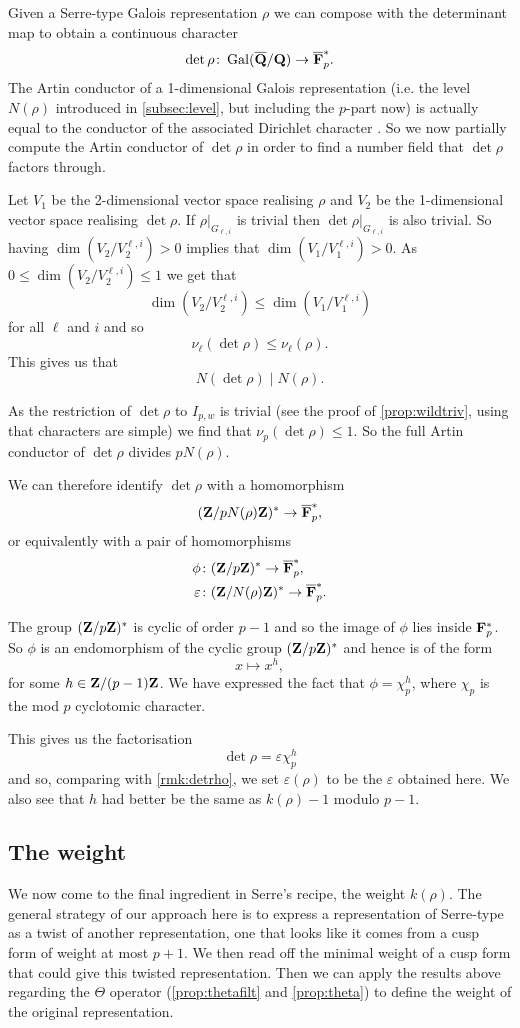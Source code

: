 \documentclass[a4paper,12pt]{article}
\begin{document}
Given a Serre-type Galois representation $\rho$ we can compose with the determinant map to obtain a continuous character
\[
\det \rho\colon \operatorname{Gal}(\overline{\mathbf{Q}}/\mathbf{Q}) \to \overline{\mathbf{F}}_p^*.
\]
The Artin conductor of a 1-dimensional Galois representation (i.e. the level $N(\rho)$ introduced in \cref{subsec:level}, but including the $p$-part now) is actually equal to the conductor of the associated Dirichlet character \cite[p. 228]{SerreLF}.
So we now partially compute the Artin conductor of $\det\rho$ in order to find a number field that $\det\rho$ factors through.

Let $V_1$ be the 2-dimensional vector space realising $\rho$ and $V_2$ be the 1-dimensional vector space realising $\det\rho$.
If $\rho|_{G_{\ell,i}}$ is trivial then $\det\rho|_{G_{\ell, i}}$ is also trivial.
So having $\dim(V_2/V_2^{\ell,i}) > 0$ implies that $\dim(V_1/V_1^{\ell,i}) > 0$.
As $0 \le \dim(V_2/V_2^{\ell,i}) \le 1$ we get that
\[
\dim(V_2/V_2^{\ell,i})\le \dim(V_1/V_1^{\ell,i})
\]
for all $\ell$ and $i$ and so
\[
\nu_\ell(\det\rho) \le \nu_\ell(\rho).
\]
This gives us that
\[
N(\det\rho) \mid N(\rho).
\]

As the restriction of $\det\rho$ to $I_{p,w}$ is trivial (see the proof of \cref{prop:wildtriv}, using that characters are simple) we find that $\nu_p(\det\rho)\le 1$.
So the full Artin conductor of $\det\rho$ divides $pN(\rho)$.

We can therefore identify $\det\rho$ with a homomorphism
\[
(\mathbf{Z}/pN(\rho)\mathbf{Z})^* \to \overline{\mathbf{F}}_p^*,
\]
or equivalently with a pair of homomorphisms
\begin{align*}
\phi\colon& (\mathbf{Z}/p\mathbf{Z})^* \to \overline{\mathbf{F}}_p^*,\\
\varepsilon\colon& (\mathbf{Z}/N(\rho)\mathbf{Z})^* \to \overline{\mathbf{F}}_p^*.
\end{align*}

The group $(\mathbf{Z}/p\mathbf{Z})^*$ is cyclic of order $p-1$ and so the image of $\phi$ lies inside $\mathbf{F}_p^*$.
So $\phi$ is an endomorphism of the cyclic group $(\mathbf{Z}/p\mathbf{Z})^*$ and hence is of the form
\[
x \mapsto x^h,
\]
for some $h \in \mathbf{Z}/(p-1)\mathbf{Z}$.
We have expressed the fact that $\phi = \chi_p^h$, where $\chi_p$ is the mod $p$ cyclotomic character.

This gives us the factorisation
\[
\det\rho = \varepsilon \chi_p^h
\]
and so, comparing with \cref{rmk:detrho}, we set $\varepsilon(\rho)$ to be the $\varepsilon$ obtained here.
We also see that $h$ had better be the same as $k(\rho)-1$ modulo $p-1$.


\subsection{The weight}
We now come to the final ingredient in Serre's recipe, the weight $k(\rho)$.
The general strategy of our approach here is to express a representation of Serre-type as a twist of another representation, one that looks like it comes from a cusp form of weight at most $p+1$.
We then read off the minimal weight of a cusp form that could give this twisted representation.
Then we can apply the results above regarding the $\Theta$ operator (\cref{prop:thetafilt} and \cref{prop:theta}) to define the weight of the original representation.
\end{document}
